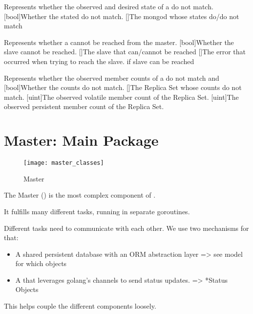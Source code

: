 {
  Represents whether the observed and desired state of a  do not match.
}{
  [bool]{Whether the stated do not match.}
  []{The mongod whose states do/do not match}
}

{
  Represents whether a  cannot be reached from the master.
}{
  [bool]{Whether the slave cannot be reached.}
  []{The slave that can/cannot be reached}
  []{The error that occurred when trying to reach the slave.  if slave can be reached}
}

{
  Represents whether the observed member counts of a  do not match  and 
}{
  [bool]{Whether the counts do not match.}
  []{The Replica Set whose counts do not match.}
  [uint]{The observed volatile member count of the Replica Set.}
  [uint]{The observed persistent member count of the Replica Set.}
}


\section{Master: Main Package}

\begin{figure}[H]
	\texttt{[image: master\_classes]}
	\caption{Master}
\end{figure}

The Master () is the most complex component of \mamid.

It fulfills many different tasks, running in separate goroutines.

Different tasks need to communicate with each other. We use two mechanisms for that:
\begin{itemize}
	\item A shared persistent database with an ORM abstraction layer => see model for which objects
	\item A  that leverages golang's channels to send status updates. => *Status Objects %
\end{itemize}
This helps couple the different components loosely.

